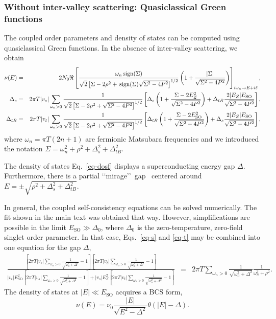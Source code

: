 \documentclass[showpacs,superscriptaddress,onecolumn,prb]{revtex4}
\begin{document}
\subsubsection{Without inter-valley scattering: Quasiclassical Green functions}

The coupled order parameters and  density of states can be computed using quasiclassical Green functions. In the absence of inter-valley scattering, we obtain~\cite{Ilic-unpub}
\begin{eqnarray}
\nu(E)
&=&2N_0\Re\left[\frac{\omega_n{\rm\, sign}(\Sigma)}{\sqrt2\left[\Sigma-2\rho^2 +{\rm\, sign}(\Sigma)\sqrt{\Sigma^2-4P^2}\right]^{1/2}}\left(1+\frac{|\Sigma|}{\sqrt{\Sigma^2-4P^2}}\right)\right]_{i\omega_n\to E+i\delta},\label{eq-dosf}\\
\Delta_s
&=&2\pi T|v_s|\sum_{\omega_n>0} \frac1{\sqrt2\left[\Sigma-2\rho^2 +\sqrt{\Sigma^2-4P^2}\right]^{1/2}}\left[\Delta_s\left(1+\frac{\Sigma-2E_Z^2}{\sqrt{\Sigma^2-4P^2}}\right)+\Delta_{tB}\frac{2|E_Z|E_{\mathrm{SO}}}{\sqrt{\Sigma^2-4P^2}}\right],\label{eq-s}\\
\Delta_{tB}
&=&2\pi T|v_t|\sum_{\omega_n>0} \frac1{\sqrt2\left[\Sigma-2\rho^2 +\sqrt{\Sigma^2-4P^2}\right]^{1/2}}\left[\Delta_{tB}\left(1+\frac{\Sigma-2E_{\mathrm{SO}}^2}{\sqrt{\Sigma^2-4P^2}}\right)+\Delta_s\frac{2|E_Z|E_{\mathrm{SO}}}{\sqrt{\Sigma^2-4P^2}}\right],\label{eq-t}
\end{eqnarray}
where $\omega_{n}=\pi T\left(2n+1\right)$ are fermionic Matsubara frequencies and we introduced the notation $\Sigma=\omega_n^2+\rho^2+\Delta_s^2+\Delta_{tB}^2$.

The density of states Eq.~\eqref{eq-dosf} displays a superconducting energy gap $\Delta$. Furthermore, there is  a partial \lq\lq mirage\rq\rq\ gap~\cite{Belzig}  centered around $E=\pm\sqrt{\rho^2+\Delta_s^2+\Delta_{tB}^2}$.

In general, the coupled self-consistency equations can be solved numerically. The fit shown in the main text was obtained that way. However, simplifications are possible in the limit $E_{\mathrm{SO}}\gg\Delta_0$, where $\Delta_0$ is the zero-temperature, zero-field singlet order parameter. In that case, Eqs.~\eqref{eq-s} and \eqref{eq-t} may be combined into one equation for the gap $\Delta$,
\begin{eqnarray}
\!\!\frac{\left[2\pi T|v_s|\sum_{\omega_n>0} \frac1{\sqrt{\omega_n^2+\Delta^2}}-1\right]\left[2\pi T|v_t|\sum_{\omega_n>0} \frac1{\sqrt{\omega_n^2+\Delta^2}}-1\right]}{|v_t|E_{\mathrm{SO}}^2\left[2\pi T|v_s|\sum_{\omega_n>0} \frac1{\sqrt{\omega_n^2+\Delta^2}}-1\right]+|v_s|E_Z^2\left[2\pi T|v_t|\sum_{\omega_n>0} \frac1{\sqrt{\omega_n^2+\Delta^2}}-1\right]}&=&2\pi T\sum_{\omega_n>0}\frac1{\sqrt{\omega_n^2+\Delta^2}}\frac1{\omega_n^2+\rho^2}.\;\;\label{eq-gap}
\end{eqnarray}
The density of states  at $|E|\ll E_{\mathrm{SO}}$ acquires a BCS form,
\begin{equation}
\nu(E)=\nu_0\frac{|E|}{\sqrt{E^2-\Delta^2}}\theta(|E|-\Delta).
\end{equation}
\end{document}
